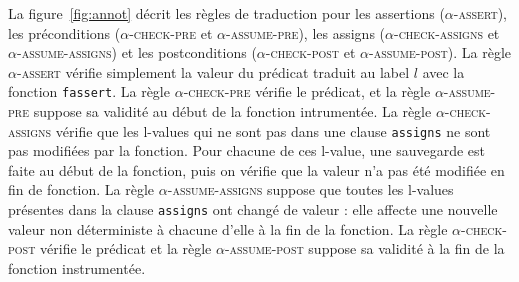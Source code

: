 La figure~\ref{fig:annot} décrit les règles de traduction pour les assertions
(\textsc{$\alpha$-assert}), les préconditions (\textsc{$\alpha$-check-pre} et
\textsc{$\alpha$-assume-pre}), les assigns (\textsc{$\alpha$-check-assigns} et
\textsc{$\alpha$-assume-assigns}) et les postconditions
(\textsc{$\alpha$-check-post} et \textsc{$\alpha$-assume-post}).
La règle \textsc{$\alpha$-assert} vérifie simplement la valeur du prédicat
traduit au label $l$ avec la fonction \lstinline'fassert'.
La règle \textsc{$\alpha$-check-pre} vérifie le prédicat, et la règle
\textsc{$\alpha$-assume-pre} suppose sa validité au début de la fonction
intrumentée.
La règle \textsc{$\alpha$-check-assigns} vérifie que les l-values qui ne sont
pas dans une clause \lstinline'assigns' ne sont pas modifiées par la fonction.
Pour chacune de ces l-value, une sauvegarde est faite au début de la fonction,
puis on vérifie que la valeur n'a pas été modifiée en fin de fonction.
La règle \textsc{$\alpha$-assume-assigns} suppose que toutes les l-values
présentes dans la clause \lstinline'assigns' ont changé de valeur : elle affecte
une nouvelle valeur non déterministe à chacune d'elle à la fin de la fonction.
La règle \textsc{$\alpha$-check-post} vérifie le prédicat et la règle
\textsc{$\alpha$-assume-post} suppose sa validité à la fin de la fonction
instrumentée.

